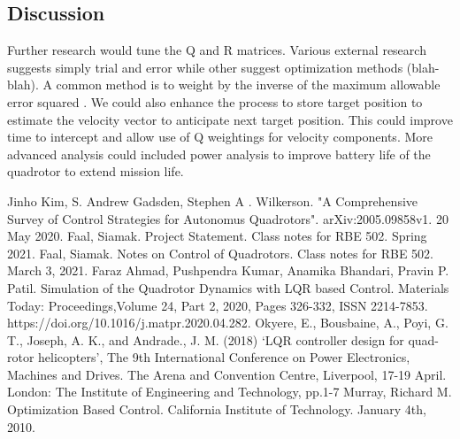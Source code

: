 \documentclass{article}
\begin{document}
\begin{multicols}{2}
\section*{Discussion}
Further research would tune the Q and R matrices.  Various external research suggests simply trial and error while other suggest optimization methods (blah-blah). A common method is to weight by the inverse of the maximum allowable error squared \cite{mur}.  We could also enhance the process to store target position to estimate the velocity vector to anticipate next target position.  This could improve time to intercept and allow use of Q weightings for velocity components. More advanced analysis could included power analysis to improve battery life of the quadrotor to extend mission life.
\label{References}

\begin{thebibliography}{10}
Jinho Kim, S. Andrew Gadsden, Stephen A . Wilkerson.
"A Comprehensive Survey of Control Strategies for Autonomus Quadrotors".
arXiv:2005.09858v1.
20 May 2020.
Faal, Siamak. Project Statement.  Class notes for RBE 502. Spring 2021.
Faal, Siamak. Notes on Control of Quadrotors. Class notes for RBE 502. March 3, 2021.
Faraz Ahmad, Pushpendra Kumar, Anamika Bhandari, Pravin P. Patil.
Simulation of the Quadrotor Dynamics with LQR based Control.
Materials Today: Proceedings,Volume 24, Part 2, 2020, Pages 326-332,
ISSN 2214-7853.
https://doi.org/10.1016/j.matpr.2020.04.282.
Okyere, E., Bousbaine, A., Poyi, G. T., Joseph, A. K., and Andrade.,
J. M. (2018) ‘LQR controller design for quad-rotor helicopters’,
The 9th International Conference on Power Electronics, Machines
and Drives. The Arena and Convention Centre, Liverpool, 17-19
April. London: The Institute of Engineering and Technology, pp.1-7
Murray, Richard M. Optimization Based Control.  California Institute of Technology. January 4th, 2010.



\end{thebibliography}

\end{multicols}
\end{document}
